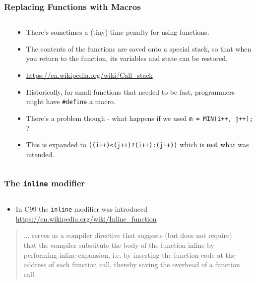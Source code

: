 \begin{frame}[fragile]
\frametitle{Replacing Functions with Macros}
\begin{columns}

\begin{column}{0.40\textwidth}

\end{column}

\begin{column}{0.50\textwidth}
\begin{itemize}[<+->]
\item There's sometimes a (tiny) time penalty for using functions.
\item The contents of the functions are saved onto a special stack, so that when you return to the function, its variables and state can be restored.
\item \url{https://en.wikipedia.org/wiki/Call_stack}
\item Historically, for small functions that needed to be fast, programmers might have \verb^#define^ a macro.
\item There's a problem though - what happens if we used {\tt m = MIN(i++, j++);} ?
\item This is expanded to {\tt ((i++)<(j++)?(i++):(j++))} which is {\bf not} what was intended.
\end{itemize}
\end{column}

\end{columns}
\end{frame}


\begin{frame}[fragile]
\frametitle{The {\tt inline} modifier}
\begin{columns}

\begin{column}{0.50\textwidth}
\begin{itemize}[<+->]
\item In C99 the {\tt inline} modifier was introduced
\url{https://en.wikipedia.org/wiki/Inline_function}
\end{itemize}
\begin{quote}
... serves as a compiler directive that suggests (but does not
require) that the compiler substitute the body of the function inline by
performing inline expansion, i.e. by inserting the function code at the
address of each function call, thereby saving the overhead of a function
call.
\end{quote}
\end{column}

\begin{column}{0.40\textwidth}

\end{column}

\end{columns}
\end{frame}


